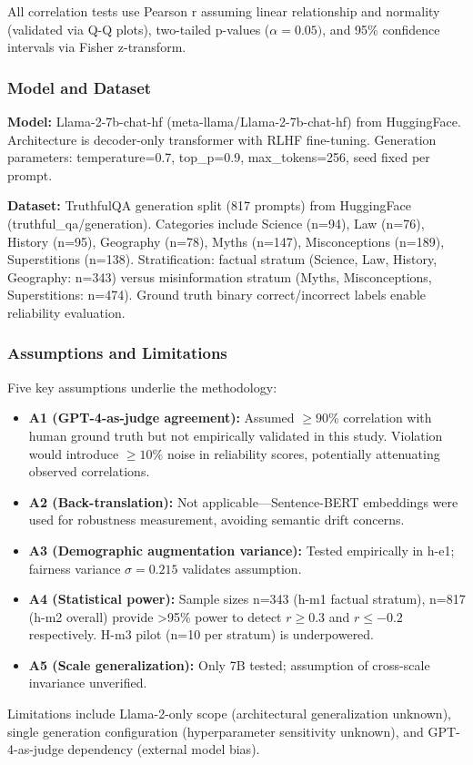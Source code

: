 All correlation tests use Pearson r assuming linear relationship and normality (validated via Q-Q plots), two-tailed p-values ($\alpha =0.05)$, and 95\% confidence intervals via Fisher z-transform.

\subsubsection{Model and Dataset}

\textbf{Model:} Llama-2-7b-chat-hf (meta-llama/Llama-2-7b-chat-hf) from HuggingFace. Architecture is decoder-only transformer with RLHF fine-tuning. Generation parameters: temperature=0.7, top\_p=0.9, max\_tokens=256, seed fixed per prompt.

\textbf{Dataset:} TruthfulQA generation split (817 prompts) from HuggingFace (truthful\_qa/generation). Categories include Science (n=94), Law (n=76), History (n=95), Geography (n=78), Myths (n=147), Misconceptions (n=189), Superstitions (n=138). Stratification: factual stratum (Science, Law, History, Geography: n=343) versus misinformation stratum (Myths, Misconceptions, Superstitions: n=474). Ground truth binary correct/incorrect labels enable reliability evaluation.

\subsubsection{Assumptions and Limitations}

Five key assumptions underlie the methodology:

\begin{itemize}
\item \textbf{A1 (GPT-4-as-judge agreement):} Assumed $\geq 90$\% correlation with human ground truth but not empirically validated in this study. Violation would introduce $\geq 10$\% noise in reliability scores, potentially attenuating observed correlations.
\item \textbf{A2 (Back-translation):} Not applicable---Sentence-BERT embeddings were used for robustness measurement, avoiding semantic drift concerns.
\item \textbf{A3 (Demographic augmentation variance):} Tested empirically in h-e1; fairness variance $\sigma =0.215$ validates assumption.
\item \textbf{A4 (Statistical power):} Sample sizes n=343 (h-m1 factual stratum), n=817 (h-m2 overall) provide >95\% power to detect $r\geq 0.3$ and $r\leq -0.2$ respectively. H-m3 pilot (n=10 per stratum) is underpowered.
\item \textbf{A5 (Scale generalization):} Only 7B tested; assumption of cross-scale invariance unverified.
\end{itemize}

Limitations include Llama-2-only scope (architectural generalization unknown), single generation configuration (hyperparameter sensitivity unknown), and GPT-4-as-judge dependency (external model bias).
